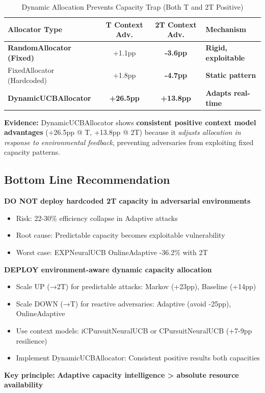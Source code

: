 \documentclass[11pt,a4paper]{article}
\newcommand{\critical}[1]{\textcolor{criticalcolor}{\textbf{#1}}}
\newcommand{\success}[1]{\textcolor{successcolor}{\textbf{#1}}}
\begin{document}
\begin{table}[h]
\scriptsize
\centering
\begin{tabular}{lccl}
\toprule
\textbf{Allocator Type} & \textbf{T Context Adv.} & \textbf{2T Context Adv.} & \textbf{Mechanism} \\
\midrule
\critical{RandomAllocator (Fixed)} & +1.1pp & \critical{-3.6pp} & \critical{Rigid, exploitable} \\
FixedAllocator (Hardcoded) & +1.8pp & \critical{-4.7pp} & \critical{Static pattern} \\
\success{DynamicUCBAllocator} & \success{+26.5pp} & \success{+13.8pp} & \success{Adapts real-time} \\
\bottomrule
\end{tabular}
\vspace{-0.2cm}
\caption{Dynamic Allocation Prevents Capacity Trap (Both T and 2T Positive)}
\end{table}

\vspace{-0.2cm}

\textbf{Evidence:} DynamicUCBAllocator shows \success{consistent positive context model advantages} (+26.5pp @ T, +13.8pp @ 2T) because it \textit{adjusts allocation in response to environmental feedback}, preventing adversaries from exploiting fixed capacity patterns.

\subsection{Bottom Line Recommendation}

\begin{tcolorbox}[colback=criticalcolor!10,colframe=criticalcolor,title=Critical Production Guidance]
\scriptsize
\textbf{DO NOT deploy hardcoded 2T capacity in adversarial environments}
\begin{itemize}
\item Risk: 22-30\% efficiency collapse in Adaptive attacks
\item Root cause: Predictable capacity becomes exploitable vulnerability
\item Worst case: EXPNeuralUCB OnlineAdaptive -36.2\% with 2T
\end{itemize}

\textbf{DEPLOY environment-aware dynamic capacity allocation}
\begin{itemize}
\item Scale UP (→2T) for predictable attacks: Markov (+23pp), Baseline (+14pp)
\item Scale DOWN (→T) for reactive adversaries: Adaptive (avoid -25pp), OnlineAdaptive
\item Use context models: iCPursuitNeuralUCB or CPursuitNeuralUCB (+7-9pp resilience)
\item Implement DynamicUCBAllocator: Consistent positive results both capacities
\end{itemize}

\textbf{Key principle:} \success{Adaptive capacity intelligence > absolute resource availability}
\end{tcolorbox}
\end{document}
